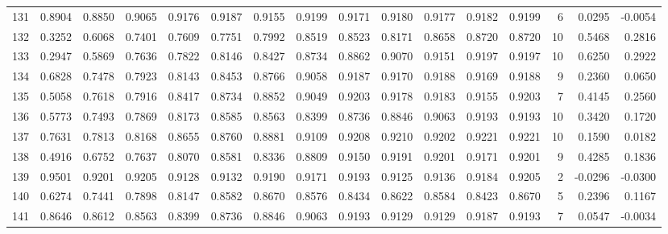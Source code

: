 \begin{tabular}{lrrrrrrrrrrrrrrr}
131 &      0.8904 &  0.8850 &  0.9065 &  0.9176 &  0.9187 &  0.9155 &  0.9199 &  0.9171 &  0.9180 &  0.9177 &   0.9182 &     0.9199 &      6 &                    0.0295 &                    -0.0054 \\
132 &      0.3252 &  0.6068 &  0.7401 &  0.7609 &  0.7751 &  0.7992 &  0.8519 &  0.8523 &  0.8171 &  0.8658 &   0.8720 &     0.8720 &     10 &                    0.5468 &                     0.2816 \\
133 &      0.2947 &  0.5869 &  0.7636 &  0.7822 &  0.8146 &  0.8427 &  0.8734 &  0.8862 &  0.9070 &  0.9151 &   0.9197 &     0.9197 &     10 &                    0.6250 &                     0.2922 \\
134 &      0.6828 &  0.7478 &  0.7923 &  0.8143 &  0.8453 &  0.8766 &  0.9058 &  0.9187 &  0.9170 &  0.9188 &   0.9169 &     0.9188 &      9 &                    0.2360 &                     0.0650 \\
135 &      0.5058 &  0.7618 &  0.7916 &  0.8417 &  0.8734 &  0.8852 &  0.9049 &  0.9203 &  0.9178 &  0.9183 &   0.9155 &     0.9203 &      7 &                    0.4145 &                     0.2560 \\
136 &      0.5773 &  0.7493 &  0.7869 &  0.8173 &  0.8585 &  0.8563 &  0.8399 &  0.8736 &  0.8846 &  0.9063 &   0.9193 &     0.9193 &     10 &                    0.3420 &                     0.1720 \\
137 &      0.7631 &  0.7813 &  0.8168 &  0.8655 &  0.8760 &  0.8881 &  0.9109 &  0.9208 &  0.9210 &  0.9202 &   0.9221 &     0.9221 &     10 &                    0.1590 &                     0.0182 \\
138 &      0.4916 &  0.6752 &  0.7637 &  0.8070 &  0.8581 &  0.8336 &  0.8809 &  0.9150 &  0.9191 &  0.9201 &   0.9171 &     0.9201 &      9 &                    0.4285 &                     0.1836 \\
139 &      0.9501 &  0.9201 &  0.9205 &  0.9128 &  0.9132 &  0.9190 &  0.9171 &  0.9193 &  0.9125 &  0.9136 &   0.9184 &     0.9205 &      2 &                   -0.0296 &                    -0.0300 \\
140 &      0.6274 &  0.7441 &  0.7898 &  0.8147 &  0.8582 &  0.8670 &  0.8576 &  0.8434 &  0.8622 &  0.8584 &   0.8423 &     0.8670 &      5 &                    0.2396 &                     0.1167 \\
141 &      0.8646 &  0.8612 &  0.8563 &  0.8399 &  0.8736 &  0.8846 &  0.9063 &  0.9193 &  0.9129 &  0.9129 &   0.9187 &     0.9193 &      7 &                    0.0547 &                    -0.0034 \\

\end{tabular}
